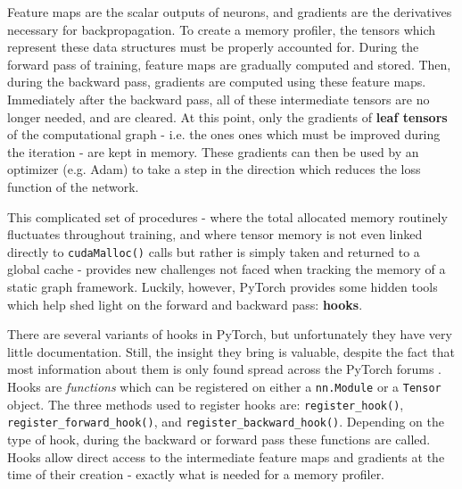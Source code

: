 \documentclass[12pt,letterpaper]{article}
\begin{document}
Feature maps are the scalar outputs of neurons, and gradients are the derivatives necessary for backpropagation. To create a memory profiler, the tensors which represent these data structures must be properly accounted for. During the forward pass of training, feature maps are gradually computed and stored. Then, during the backward pass, gradients are computed using these feature maps. Immediately after the backward pass, all of these intermediate tensors are no longer needed, and are cleared. At this point, only the gradients of \textbf{leaf tensors} \cite{pytorch_doc_leaf_requires_grad} of the computational graph - i.e. the ones ones which must be improved during the iteration - are kept in memory. These gradients can then be used by an optimizer (e.g. Adam) to take a step in the direction which reduces the loss function of the network.
\par 

This complicated set of procedures - where the total allocated memory routinely fluctuates throughout training, and where tensor memory is not even linked directly to \texttt{cudaMalloc()} calls but rather is simply taken and returned to a global cache - provides new challenges not faced when tracking the memory of a static graph framework. Luckily, however, PyTorch provides some hidden tools which help shed light on the forward and backward pass: \textbf{hooks}.
\par 

There are several variants of hooks in PyTorch, but unfortunately they have very little documentation. Still, the insight they bring is valuable, despite the fact that most information about them is only found spread across the PyTorch forums \cite{pytorch_forum}. Hooks are \textit{functions} which can be registered on either a \texttt{nn.Module} or a \texttt{Tensor} object. The three methods used to register hooks are: \texttt{register\_hook()}, \texttt{register\_forward\_hook()}, and \texttt{register\_backward\_hook()}. Depending on the type of hook, during the backward or forward pass these functions are called. Hooks allow direct access to the intermediate feature maps and gradients at the time of their creation - exactly what is needed for a memory profiler.
\par 
\end{document}
